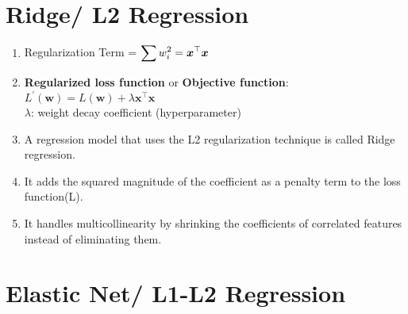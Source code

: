 \section{Ridge/ L2 Regression}

\begin{enumerate}
    \item Regularization Term = $ \displaystyle\sum w_i^2 = \bm{x}^\top\bm{x}$
    \hfill \cite{geeksforgeeks/machine-learning/regularization-in-machine-learning}

    \item \textbf{Regularized loss function} or \textbf{Objective function}:
    $
        L^\prime (\bm{w}) = L (\bm{w}) + \lambda \bm{x}^\top\bm{x}
    $
    \\
    $\lambda$: weight decay coefficient (hyperparameter)

    \item A regression model that uses the L2 regularization technique is called Ridge regression.
    \hfill \cite{geeksforgeeks/machine-learning/regularization-in-machine-learning}

    \item It adds the squared magnitude of the coefficient as a penalty term to the loss function(L).
    \hfill \cite{geeksforgeeks/machine-learning/regularization-in-machine-learning}

    \item It handles multicollinearity by shrinking the coefficients of correlated features instead of eliminating them.
    \hfill \cite{geeksforgeeks/machine-learning/regularization-in-machine-learning}
\end{enumerate}




\section{Elastic Net/ L1-L2 Regression}


